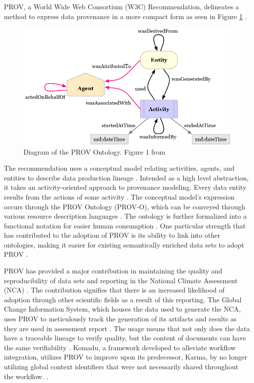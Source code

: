 PROV, a World Wide Web Consortium (W3C) Recommendation, delineates a method to express data provenance in a more compact form as seen in Figure \ref{PROVO} \cite{Gil2013a} \cite{Groth2013}.
\begin{figure}
	\centering
	\includegraphics[scale=0.5]{figures/ProvO.png}
	\caption[Diagram of the PROV Ontology.]{Diagram of the PROV Ontology.  Figure 1 from \cite{Lebo2013}}
	\label{PROVO}
\end{figure}
The recommendation uses a conceptual model relating activities, agents, and entities to describe data production lineage \cite{Moreau2013c} \cite{Nies2013} \cite{Nies2013a}.
Intended as a high level abstraction, it takes an activity-oriented approach to provenance modeling.
Every data entity results from the actions of some activity \cite{Gil2013}.
The conceptual model's expression occurs through the PROV Ontology (PROV-O), which can be conveyed through various resource description languages \cite{Hua2013} \cite{Klyne2013}.
The ontology is further formalized into a functional notation for easier human consumption \cite{Moreau2013b} \cite{Cheney2013a}.
One particular strength that has contributed to the adoption of PROV is its ability to link into other ontologies, making it easier for existing semantically enriched data sets to adopt PROV \cite{Miles2013} \cite{Moreau2013}.

PROV has provided a major contribution in maintaining the quality and reproducibility of data sets and reporting in the National Climate Assessment (NCA) \cite{Ma2014191}.
The contribution signifies that there is an increased likelihood of adoption through other scientific fields as a result of this reporting.
The Global Change Information System, which houses the data used to generate the NCA, uses PROV to meticulously track the generation of its artifacts and results as they are used in assessment report \cite{Tilmes2012}.
The usage means that not only does the data have a traceable lineage to verify quality, but the content of documents can have the same verifiability \cite{Ma2014}.
Komadu, a framework developed to alleviate workflow integration, utilizes PROV to improve upon its predecessor, Karma, by no longer utilizing global context identifiers that were not necessarily shared throughout the workflow. \cite{Suriarachchi_2015}.

